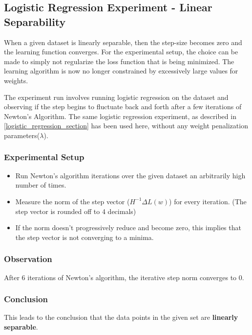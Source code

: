 \documentclass[a4paper]{article}
\begin{document}
\newpage

\subsection{Logistic Regression Experiment - Linear Separability}
When a given dataset is linearly separable, then the step-size becomes zero and the learning function converges. For the experimental setup, the choice can be made to simply not regularize the loss function that is being minimized. The learning algorithm is now no longer constrained by excessively large values for weights. 

The experiment run involves running logistic regression on the dataset and observing if the step begins to fluctuate back and forth after a few iterations of Newton's Algorithm. The same logistic regression experiment, as described in \ref{logistic_regression_section} has been used here, without any weight penalization parameters($\lambda$). 

\subsubsection*{Experimental Setup}
\begin{itemize}
    \item Run Newton's algorithm iterations over the given dataset an arbitrarily high number of times.
	\item Measure the norm of the step vector ($H^{-1} \Delta L(w)$) for every iteration. (The step vector is rounded off to 4 decimals)
    \item If the norm doesn't progressively reduce and become zero, this implies that the step vector is not converging to a minima.
\end{itemize}

\subsubsection*{Observation}
After 6 iterations of Newton's algorithm, the iterative step norm converges to 0.

\subsubsection*{Conclusion}
This leads to the conclusion that the data points in the given set are \textbf{linearly separable}.
\end{document}
